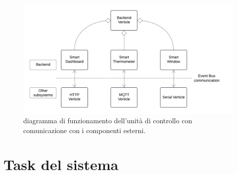 \documentclass{report}
\begin{document}
\begin{figure}[H]
    \centering
    \includegraphics[width=\linewidth]{img/assignment-03/Control Unit Diagram.png}
    \caption{diagramma di funzionamento dell'unità di controllo con comunicazione con i componenti esterni.}
    \label{fig:main-task}
\end{figure}

\section{Task del sistema}
\end{document}
